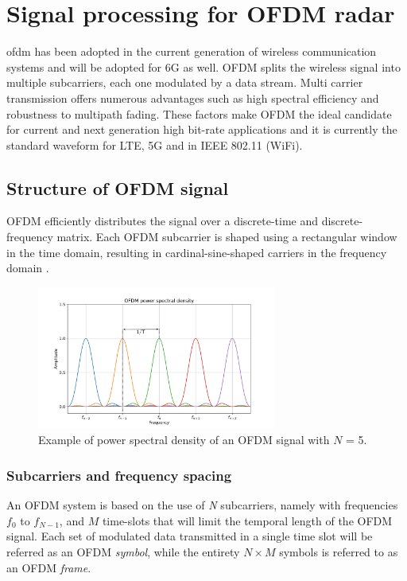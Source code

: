 \chapter{Signal processing for OFDM radar}
\label{chap:theoretical_OFDM}

\gls{ofdm} has been adopted in the current generation of wireless communication systems and will be adopted for 6G as well.
OFDM splits the wireless signal into multiple subcarriers, each one modulated by a data stream. Multi carrier transmission offers numerous advantages such as high spectral efficiency and robustness to multipath fading. These factors make OFDM the ideal candidate for current and next generation high bit-rate applications and it is currently the standard waveform for LTE, 5G and in IEEE 802.11 (WiFi).

\section{Structure of OFDM signal}

OFDM efficiently distributes the signal over a discrete-time and discrete-frequency matrix. Each OFDM subcarrier is shaped using a rectangular window in the time domain, resulting in cardinal-sine-shaped carriers in the frequency domain \cite{Schaich_Wild_2014}.

\begin{figure}[H]
    \centering
    \includegraphics[width=0.7\textwidth]{Images/theoretical/ofdm/ofdm_psd_mod.png}
    \caption{Example of power spectral density of an OFDM signal with $N$ = 5.}
    \label{fig:quadtree}
\end{figure}

\subsection{Subcarriers and frequency spacing}
An OFDM system is based on the use of \textit{N} subcarriers, namely with frequencies $f_0$ to $f_{N-1}$, and $M$ time-slots that will limit the temporal length of the OFDM signal.
Each set of modulated data transmitted in a single time slot will be referred as an OFDM \textit{symbol}, while the entirety $N\times M$ symbols is referred to as an OFDM \textit{frame}.

